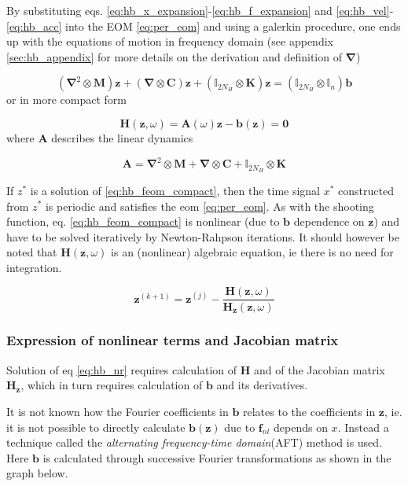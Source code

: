 By substituting eqs. \eqref{eq:hb_x_expansion}-\eqref{eq:hb_f_expansion} and
\eqref{eq:hb_vel}-\eqref{eq:hb_acc} into the EOM \eqref{eq:per_eom} and using a
galerkin procedure, one ends up with the equations of motion in frequency
domain (see appendix \ref{sec:hb_appendix} for more details on the derivation
and definition of $\bm \nabla$)

\begin{equation}
  \label{eq:hb_feom}
  (\bm \nabla^2 \otimes \bm M)\bm z + (\bm \nabla \otimes \bm C)\bm z +
  (\mathbb{I}_{2N_H} \otimes \bm K)\bm z =
  (\mathbb{I}_{2N_H} \otimes \mathbb{I}_n )\bm b
\end{equation}
or in more compact form

\begin{equation}
  \label{eq:hb_feom_compact}
  \bm H(\bm z, \omega) = \bm A(\omega) \bm z - \bm b(\bm z) = \bm 0
\end{equation}
where $\bm A$ describes the linear dynamics

\begin{equation}
  \label{eq:hb_A}
  \bm A = \bm \nabla^2 \otimes \bm M + \bm \nabla \otimes \bm C +
  \mathbb{I}_{2N_H} \otimes \bm K
\end{equation}

If $z^*$ is a solution of \eqref{eq:hb_feom_compact}, then the time signal $x^*$
constructed from $z^*$ is periodic and satisfies the eom \eqref{eq:per_eom}. As
with the shooting function, eq. \eqref{eq:hb_feom_compact} is nonlinear (due to
$\bm b$ dependence on $\bm z$) and have to be solved iteratively by
Newton-Rahpson iterations. It should however be noted that $\bm H(\bm z,
\omega)$ is an (nonlinear) algebraic equation, ie there is no need for
integration.

\begin{equation}
  \label{eq:hb_nr}
  \bm z^{(k+1)} = \bm z^{(j)} -
  \frac{\bm H(\bm z, \omega)}{\bm H_{\bm z}(\bm z, \omega)}
\end{equation}


\subsubsection{Expression of nonlinear terms and Jacobian matrix}
\label{sec:hb_exp_nonlin_jac}

Solution of eq \eqref{eq:hb_nr} requires calculation of $\bm H$ and of the
Jacobian matrix $\bm H_{\bm z}$, which in turn requires calculation of $\bm b$
and its derivatives.

It is not known how the Fourier coefficients in $\bm b$ relates to the
coefficients in $\bm z$, ie. it is not possible to directly calculate $\bm b(\bm
z)$ due to $\bm f_{nl}$ depends on $x$. Instead a technique called the
\textit{alternating frequency-time domain}(AFT) method is used. Here $\bm b$ is
calculated through successive Fourier transformations as shown in the graph below.

